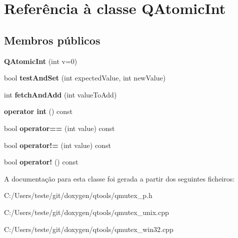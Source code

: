 \hypertarget{class_q_atomic_int}{\section{Referência à classe Q\-Atomic\-Int}
\label{class_q_atomic_int}
}
\subsection*{Membros públicos}
\begin{DoxyCompactItemize}
\item 
\hypertarget{class_q_atomic_int_ac986dabae62dc093fe34f72f585e55ae}{{\bfseries Q\-Atomic\-Int} (int v=0)}\label{class_q_atomic_int_ac986dabae62dc093fe34f72f585e55ae}

\item 
\hypertarget{class_q_atomic_int_a26fc8328f419c76b9288e5eb17a22475}{bool {\bfseries test\-And\-Set} (int expected\-Value, int new\-Value)}\label{class_q_atomic_int_a26fc8328f419c76b9288e5eb17a22475}

\item 
\hypertarget{class_q_atomic_int_a24e3a1e8aa0677bde7bd1a08c320672d}{int {\bfseries fetch\-And\-Add} (int value\-To\-Add)}\label{class_q_atomic_int_a24e3a1e8aa0677bde7bd1a08c320672d}

\item 
\hypertarget{class_q_atomic_int_a6a6c0aaee2d785b48a1e57710ceb586b}{{\bfseries operator int} () const }\label{class_q_atomic_int_a6a6c0aaee2d785b48a1e57710ceb586b}

\item 
\hypertarget{class_q_atomic_int_a6cb591446ea4540655a19c6a354271b6}{bool {\bfseries operator==} (int value) const }\label{class_q_atomic_int_a6cb591446ea4540655a19c6a354271b6}

\item 
\hypertarget{class_q_atomic_int_a6318a98cec92eb28c86a3aca725db28d}{bool {\bfseries operator!=} (int value) const }\label{class_q_atomic_int_a6318a98cec92eb28c86a3aca725db28d}

\item 
\hypertarget{class_q_atomic_int_ac8b1d32dbd52d431450c70b151cfa205}{bool {\bfseries operator!} () const }\label{class_q_atomic_int_ac8b1d32dbd52d431450c70b151cfa205}

\end{DoxyCompactItemize}


A documentação para esta classe foi gerada a partir dos seguintes ficheiros\-:\begin{DoxyCompactItemize}
\item 
C\-:/\-Users/teste/git/doxygen/qtools/qmutex\-\_\-p.\-h\item 
C\-:/\-Users/teste/git/doxygen/qtools/qmutex\-\_\-unix.\-cpp\item 
C\-:/\-Users/teste/git/doxygen/qtools/qmutex\-\_\-win32.\-cpp\end{DoxyCompactItemize}
